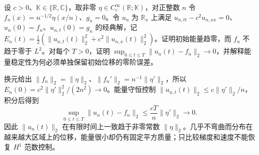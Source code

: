 \begin{exercise}\label{b2:ex:09-missing-zero-order}
设 \(c>0\)、\(\mathbb K\in\{\mathbb R,\mathbb C\}\)，取非零 \(\eta\in C_c^\infty(\mathbb R;\mathbb K)\)，对正整数 \(n\) 令 \(f_n(x)=n^{-1/2}\eta(x/n)\)、\(g_n=0\)。令 \(u_n\) 为 \(\mathbb R_x\) 上满足 \(u_{n,tt}-c^2u_{n,xx}=0\)、\(u_n(0)=f_n\)、\(u_{n,t}(0)=g_n\) 的经典解，记 \(E_n(t)=\frac12(\|u_{n,t}(t)\|_2^2+c^2\|u_{n,x}(t)\|_2^2)\)。证明初始能量趋零，而 \(f_n\) 不趋于零于 \(L^2\)。对每个 \(T>0\)，证明 \(\sup_{0\leq t\leq T}\|u_n(t)-f_n\|_2\to0\)，并解释能量稳定性为何必须单独保留初始位移的零阶误差。
\end{exercise}
\begin{solution}
换元给出 \(\|f_n\|_2=\|\eta\|_2\)、\(\|f_n'\|_2=n^{-1}\|\eta'\|_2\)，所以 \(E_n(0)=c^2\|\eta'\|_2^2/(2n^2)\to0\)。能量守恒控制 \(\|u_{n,t}(t)\|_2\leq c\|\eta'\|_2/n\)，积分后得到
\[
 \sup_{0\leq t\leq T}\|u_n(t)-f_n\|_2\leq\dfrac{cT}{n}\|\eta'\|_2\longrightarrow0.
\]
因此 \(\|u_n(t)\|_2\) 在有限时间上一致趋于非零常数 \(\|\eta\|_2\)。几乎不弯曲而分布在越来越大区域上的位移，能量很小却仍有固定平方质量；只比较梯度和速度不能恢复 \(H^1\) 范数控制。
\end{solution}

